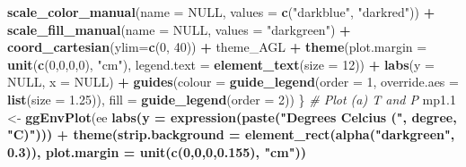 \documentclass[
]{article}
\newenvironment{Shaded}{\begin{snugshade}}{\end{snugshade}}
\newcommand{\CommentTok}[1]{\textcolor[rgb]{0.56,0.35,0.01}{\textit{#1}}}
\newcommand{\DataTypeTok}[1]{\textcolor[rgb]{0.13,0.29,0.53}{#1}}
\newcommand{\DecValTok}[1]{\textcolor[rgb]{0.00,0.00,0.81}{#1}}
\newcommand{\FloatTok}[1]{\textcolor[rgb]{0.00,0.00,0.81}{#1}}
\newcommand{\KeywordTok}[1]{\textcolor[rgb]{0.13,0.29,0.53}{\textbf{#1}}}
\newcommand{\NormalTok}[1]{#1}
\newcommand{\OperatorTok}[1]{\textcolor[rgb]{0.81,0.36,0.00}{\textbf{#1}}}
\newcommand{\OtherTok}[1]{\textcolor[rgb]{0.56,0.35,0.01}{#1}}
\newcommand{\StringTok}[1]{\textcolor[rgb]{0.31,0.60,0.02}{#1}}
\begin{document}
\begin{Shaded}
\begin{Highlighting}[]
{{\StringTok{    }\KeywordTok{scale_color_manual}\NormalTok{(}\DataTypeTok{name =} \OtherTok{NULL}\NormalTok{, }\DataTypeTok{values =} \KeywordTok{c}\NormalTok{(}\StringTok{"darkblue"}\NormalTok{, }\StringTok{"darkred"}\NormalTok{)) }\OperatorTok{+}
\StringTok{    }\KeywordTok{scale_fill_manual}\NormalTok{(}\DataTypeTok{name =} \OtherTok{NULL}\NormalTok{, }\DataTypeTok{values =} \StringTok{"darkgreen"}\NormalTok{) }\OperatorTok{+}
\StringTok{    }\KeywordTok{coord_cartesian}\NormalTok{(}\DataTypeTok{ylim=}\KeywordTok{c}\NormalTok{(}\DecValTok{0}\NormalTok{, }\DecValTok{40}\NormalTok{)) }\OperatorTok{+}
\StringTok{    }\NormalTok{theme_AGL }\OperatorTok{+}\StringTok{ }
\StringTok{    }\KeywordTok{theme}\NormalTok{(}\DataTypeTok{plot.margin =} \KeywordTok{unit}\NormalTok{(}\KeywordTok{c}\NormalTok{(}\DecValTok{0}\NormalTok{,}\DecValTok{0}\NormalTok{,}\DecValTok{0}\NormalTok{,}\DecValTok{0}\NormalTok{), }\StringTok{"cm"}\NormalTok{),}
          \DataTypeTok{legend.text =} \KeywordTok{element_text}\NormalTok{(}\DataTypeTok{size =} \DecValTok{12}\NormalTok{)) }\OperatorTok{+}
\StringTok{    }\KeywordTok{labs}\NormalTok{(}\DataTypeTok{y =} \OtherTok{NULL}\NormalTok{, }\DataTypeTok{x =} \OtherTok{NULL}\NormalTok{) }\OperatorTok{+}
\StringTok{    }\KeywordTok{guides}\NormalTok{(}\DataTypeTok{colour =} \KeywordTok{guide_legend}\NormalTok{(}\DataTypeTok{order =} \DecValTok{1}\NormalTok{, }\DataTypeTok{override.aes =} \KeywordTok{list}\NormalTok{(}\DataTypeTok{size =} \FloatTok{1.25}\NormalTok{)), }
           \DataTypeTok{fill =} \KeywordTok{guide_legend}\NormalTok{(}\DataTypeTok{order =} \DecValTok{2}\NormalTok{))}
\NormalTok{\}}
\CommentTok{# Plot (a) T and P}
\NormalTok{mp1}\FloatTok{.1}\NormalTok{ <-}\StringTok{ }\KeywordTok{ggEnvPlot}\NormalTok{(ee }\OperatorTok{%
\StringTok{  }\KeywordTok{labs}\NormalTok{(}\DataTypeTok{y =} \KeywordTok{expression}\NormalTok{(}\KeywordTok{paste}\NormalTok{(}\StringTok{"Degrees Celcius ("}\NormalTok{, degree, }\StringTok{"C)"}\NormalTok{))) }\OperatorTok{+}\StringTok{ }
\StringTok{  }\KeywordTok{theme}\NormalTok{(}\DataTypeTok{strip.background =} \KeywordTok{element_rect}\NormalTok{(}\KeywordTok{alpha}\NormalTok{(}\StringTok{"darkgreen"}\NormalTok{, }\FloatTok{0.3}\NormalTok{)),}
        \DataTypeTok{plot.margin =} \KeywordTok{unit}\NormalTok{(}\KeywordTok{c}\NormalTok{(}\DecValTok{0}\NormalTok{,}\DecValTok{0}\NormalTok{,}\DecValTok{0}\NormalTok{,}\FloatTok{0.155}\NormalTok{), }\StringTok{"cm"}\NormalTok{))}
}}}
\end{Highlighting}
\end{Shaded}
\end{document}
